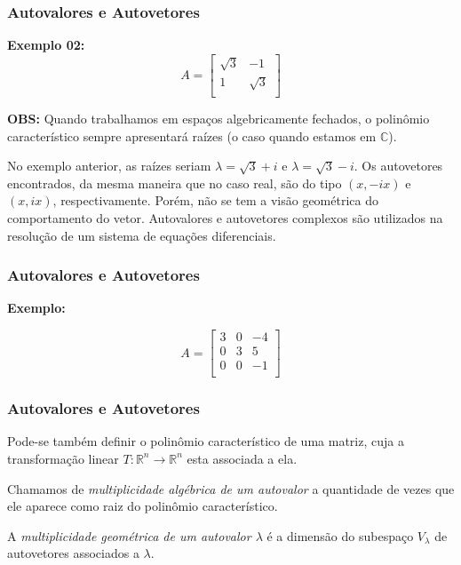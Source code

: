 \documentclass[hyperref={pdfpagelabels=false}]{beamer}
\begin{document}
\begin{frame}
\frametitle{Autovalores e Autovetores}

{\bf Exemplo 02:}
$$A = \left[
\begin{array}{cc}
\sqrt{3}	&	-1 \\
1	&	\sqrt{3} \\
\end{array}
\right]$$


{\bf OBS:} Quando trabalhamos em espaços algebricamente fechados, o polinômio característico sempre apresentará raízes (o caso quando estamos em $\mathbb{C}$). 

No exemplo anterior, as raízes seriam $\lambda = \sqrt{3} + i$ e $\lambda = \sqrt{3} - i$. Os autovetores encontrados, da mesma maneira que no caso real, são do tipo $(x,-ix)$ e $(x,ix)$, respectivamente. Porém, não se tem a visão geométrica do comportamento do vetor. Autovalores e autovetores complexos são utilizados na resolução de um sistema de equações diferenciais.

\end{frame}


\begin{frame}
\frametitle{Autovalores e Autovetores}

{\bf Exemplo:}

$$A = \left[
\begin{array}{ccc}
3	&	0	&	-4\\
0	&	3	&	5 \\
0	&	0	&	-1	\\
\end{array}
\right]$$

\end{frame}


\begin{frame}
\frametitle{Autovalores e Autovetores}

Pode-se também definir o polinômio característico de uma matriz, cuja a transformação linear $T:\mathbb{R}^n \rightarrow \mathbb{R}^n$ esta associada a ela.

\pause

\begin{definition}
	Chamamos de \emph{multiplicidade algébrica de um autovalor} a quantidade de vezes que ele aparece como raiz do polinômio característico.
	
	A \emph{multiplicidade geométrica de um autovalor $\lambda$} é a dimensão do subespaço $V_\lambda$ de autovetores associados a $\lambda$.
\end{definition}

\end{frame}
\end{document}
